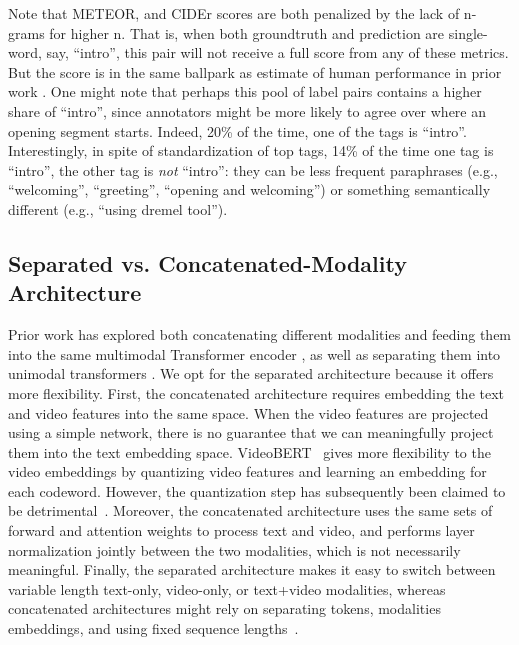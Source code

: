 \documentclass[11pt,a4paper]{article}
\begin{document}
Note that METEOR, and CIDEr scores are both penalized by the lack of n-grams for higher n.  That is, when both groundtruth and prediction are single-word, say, ``intro'', this pair will not receive a full score from any of these metrics.  But the \rouge score is in the same ballpark as estimate of human performance in prior work \cite{hessel2019case}.  One might note that perhaps this pool of label pairs contains a higher share of ``intro'', since annotators might be more likely to agree over where an opening segment starts.  Indeed, 20\% of the time, one of the tags is ``intro''.  Interestingly, in spite of  standardization of top tags, 14\% of the time one tag is ``intro'', the other tag is {\em not} ``intro'': they can be less frequent paraphrases (e.g., ``welcoming'', ``greeting'', ``opening and welcoming'') or something semantically different (e.g., ``using dremel tool'').
 


\subsection{Separated vs. Concatenated-Modality Architecture
\label{sec:separatedvsconcatenated}}

Prior work has explored both concatenating different modalities and feeding them into the same multimodal Transformer encoder \citep{sun2019videobert, hessel2019case}, as well as separating them into unimodal transformers \citep{sun2019contrastive,lu2019vilbert}.
We opt for the separated architecture because it offers more flexibility.
First, the concatenated architecture requires embedding the text and video features into the same space.
When the video features are projected using a simple network, there is no guarantee that we can meaningfully project them into the text embedding space.  VideoBERT~\citep{sun2019videobert} gives more flexibility to the video embeddings by  quantizing video features and learning an embedding for each codeword. However, the quantization step has subsequently been claimed to be detrimental~\citep{sun2019contrastive}.
Moreover, the concatenated architecture uses the same sets of forward and attention weights to process text and video, and performs layer normalization jointly between the two modalities, which is not necessarily meaningful.
Finally, the separated architecture makes it easy to switch between variable length text-only, video-only, or text+video modalities, whereas concatenated architectures might rely on separating tokens, modalities embeddings, and using fixed sequence lengths~\citep{luo2020univilm}.
\end{document}
